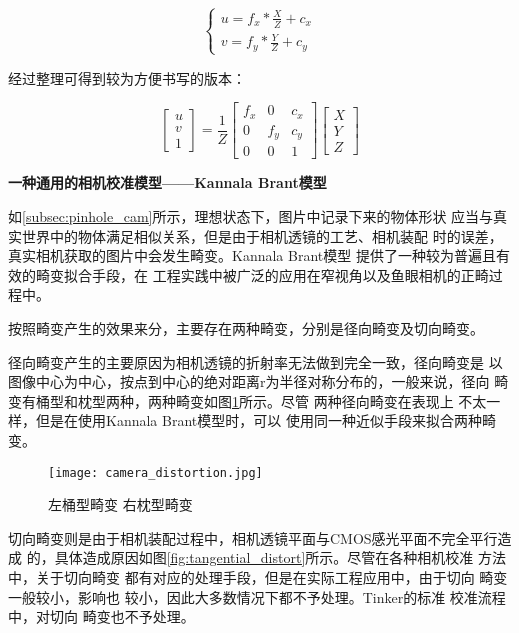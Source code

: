 \begin{equation}
  \begin{cases}
    u = f_x * \frac{X}{Z} + c_x \\
    v = f_y * \frac{Y}{Z} + c_y
  \end{cases}
\end{equation}


经过整理可得到较为方便书写的版本：

$$
\begin{bmatrix}
u \\
v \\
1
\end{bmatrix}
= \frac{1}{Z}
\begin{bmatrix}
  f_x & 0   & c_x \\
    0 & f_y & c_y \\
    0 & 0   &   1
\end{bmatrix}
\begin{bmatrix}
X \\
Y \\
Z
\end{bmatrix}
$$

\noindent \textbf{一种通用的相机校准模型——Kannala Brant模型}

如\ref{subsec:pinhole_cam}所示，理想状态下，图片中记录下来的物体形状
应当与真实世界中的物体满足相似关系，但是由于相机透镜的工艺、相机装配
时的误差，真实相机获取的图片中会发生畸变。Kannala Brant模型
\cite{kannala2006generic} 提供了一种较为普遍且有效的畸变拟合手段，在
工程实践中被广泛的应用在窄视角以及鱼眼相机的正畸过程中。

按照畸变产生的效果来分，主要存在两种畸变，分别是径向畸变及切向畸变。

径向畸变产生的主要原因为相机透镜的折射率无法做到完全一致，径向畸变是
以图像中心为中心，按点到中心的绝对距离r为半径对称分布的，一般来说，径向
畸变有桶型和枕型两种，两种畸变如图\ref{fig:radial_distort}所示。尽管
两种径向畸变在表现上 不太一样，但是在使用Kannala Brant模型时，可以
使用同一种近似手段来拟合两种畸变。

\begin{figure}[h] %
  \centering
  \texttt{[image: camera\_distortion.jpg]}
  \caption{左桶型畸变 右枕型畸变}
  \label{fig:radial_distort}
\end{figure}

切向畸变则是由于相机装配过程中，相机透镜平面与CMOS感光平面不完全平行造成
的，具体造成原因如图\ref{fig:tangential_distort}所示。尽管在各种相机校准
方法中，关于切向畸变 都有对应的处理手段，但是在实际工程应用中，由于切向
畸变一般较小，影响也 较小，因此大多数情况下都不予处理。Tinker的标准
校准流程中，对切向 畸变也不予处理。

